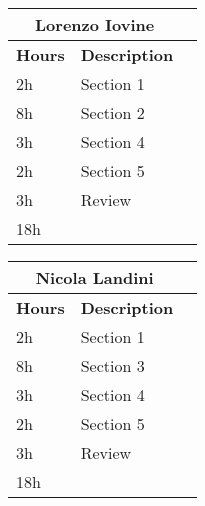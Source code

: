 \begin{table}[H]
    \centering
    \begin{tabular}{|l|l|l|}
        \multicolumn{2}{c}{\textbf{Lorenzo Iovine}}                   \\
        \hline
        \textbf{Hours} & \textbf{Description}          \\\hline
        2h             & Section 1                                              \\\hline
        8h             & Section 2                                              \\\hline
        3h             & Section 4                                              \\\hline
        2h             & Section 5                                              \\\hline
        3h             & Review                                                 \\\hline\hline
        18h            &                                                        \\\hline
    \end{tabular}
\end{table}
\bigskip
\begin{table}[H]
    \centering
    \begin{tabular}{|l|l|l|}
        \multicolumn{2}{c}{\textbf{Nicola Landini}}                      \\
        \hline
        \textbf{Hours} & \textbf{Description}          \\\hline
        2h             & Section 1                                              \\\hline
        8h             & Section 3                                              \\\hline
        3h             & Section 4                                              \\\hline
        2h             & Section 5                                              \\\hline
        3h             & Review                                                 \\\hline\hline
        18h            &                                                        \\\hline
    \end{tabular}
\end{table}
\bigskip
